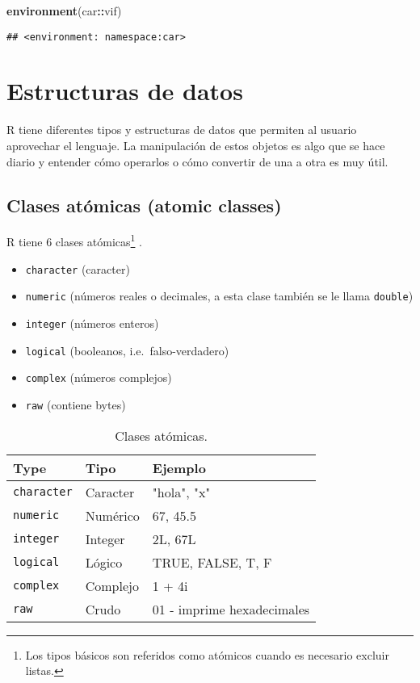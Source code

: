 \documentclass[]{article}
\newenvironment{Shaded}{\begin{snugshade}}{\end{snugshade}}
\newcommand{\KeywordTok}[1]{\textcolor[rgb]{0.13,0.29,0.53}{\textbf{#1}}}
\newcommand{\OperatorTok}[1]{\textcolor[rgb]{0.81,0.36,0.00}{\textbf{#1}}}
\newcommand{\NormalTok}[1]{#1}
\providecommand{\tightlist}{%
  \setlength{\itemsep}{0pt}\setlength{\parskip}{0pt}}
\let\rmarkdownfootnote\footnote%
\def\footnote{\protect\rmarkdownfootnote}
\begin{document}
\begin{Shaded}
\begin{Highlighting}[]
\KeywordTok{environment}\NormalTok{(car}\OperatorTok{::}\NormalTok{vif)}
\end{Highlighting}
\end{Shaded}

\begin{verbatim}
## <environment: namespace:car>
\end{verbatim}

\section{Estructuras de datos}\label{estructuras-de-datos}

R tiene diferentes tipos y estructuras de datos que permiten al usuario
aprovechar el lenguaje. La manipulación de estos objetos es algo que se
hace diario y entender cómo operarlos o cómo convertir de una a otra es
muy útil.

\subsection{Clases atómicas (atomic
classes)}\label{clases-atomicas-atomic-classes}

R tiene 6 clases atómicas\footnote{Los tipos básicos son referidos como
  atómicos cuando es necesario excluir listas.} \parencite{rmanual}.

\begin{itemize}
\tightlist
\item
  \texttt{character} (caracter)
\item
  \texttt{numeric} (números reales o decimales, a esta clase también se
  le llama \texttt{double})
\item
  \texttt{integer} (números enteros)
\item
  \texttt{logical} (booleanos, i.e.~falso-verdadero)
\item
  \texttt{complex} (números complejos)
\item
  \texttt{raw} (contiene bytes)
\end{itemize}

\begin{table}[ht]
\centering
\begin{tabular}{p{2.5cm}p{2.5cm}p{5cm}}
  \hline
Type & Tipo & Ejemplo \\ 
  \hline
\texttt{character} & Caracter & "hola", "x" \\ 
\texttt{numeric} & Numérico & 67, 45.5 \\
\texttt{integer} & Integer & 2L, 67L \\
\texttt{logical} & Lógico & TRUE, FALSE, T, F \\
\texttt{complex} & Complejo & 1 + 4i\\
\texttt{raw} & Crudo & 01 - imprime hexadecimales\\
   \hline
\end{tabular}
\caption{Clases atómicas.}
\end{table}
\end{document}
